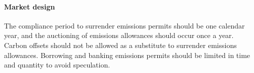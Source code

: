 \documentclass[12pt,english]{article}
\begin{document}

\paragraph{Market design} 
The compliance period to surrender emissions permits should be one calendar year, and the auctioning of emissions allowances should occur once a year. Carbon offsets should not be allowed as a substitute to surrender emissions allowances. Borrowing and banking emissions permits should be limited in time and quantity to avoid speculation. %


\end{document}
